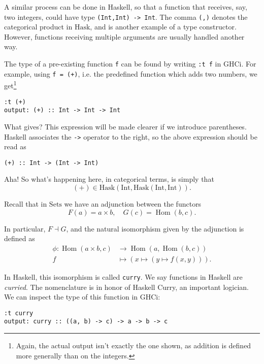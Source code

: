 \documentclass[11pt]{article}
\theoremstyle{nonumberplain}
\newcommand{\Hask}{\mathrm{Hask}}
\newcommand{\type}[1]{\mathrm{#1}}
\newcommand{\cat}[1]{\mathrm{#1}}
\DeclareMathOperator{\Hom}{Hom}
\newcommand*\lsin{\lstinline}
\begin{document}
A similar process can be done in Haskell, so that a function that receives, say, two integers, could have type \lsin|(Int,Int) -> Int|. The comma \lsin|(,)| denotes the categorical product in $\Hask$, and is another example of a type constructor. However, functions receiving multiple arguments are usually handled another way.

The type of a pre-existing function \lsin|f| can be found by writing \lsin|:t f| in GHCi. For example, using \lsin|f = (+)|, i.e. the predefined function which adds two numbers, we get\footnote{Again, the actual output isn't exactly the one shown, as addition is defined more generally than on the integers.}
\begin{lstlisting}
:t (+)
output: (+) :: Int -> Int -> Int
\end{lstlisting}

What gives? This expression will be made clearer if we introduce parentheses. Haskell associates the \lsin|->| operator to the right, so the above expression should be read as
\begin{lstlisting}
(+) :: Int -> (Int -> Int)
\end{lstlisting}

Aha! So what's happening here, in categorical terms, is simply that
\begin{equation}
(+) \in \Hask(\type{Int}, \Hask(\type{Int}, \type{Int})).
\end{equation}

Recall that in $\cat{Sets}$ we have an adjunction between the functors
\begin{equation}
F(a) = a \times b, \quad G(c) = \Hom(b,c).
\end{equation}

In particular, $F \dashv G$, and the natural isomorphism given by the adjunction is defined as
\begin{equation}
\begin{aligned}
\phi \colon \Hom(a \times b, c) &\to \Hom(a, \Hom(b,c))\\
f &\mapsto (x \mapsto (y \mapsto f(x,y))).
\end{aligned}
\end{equation}

In Haskell, this isomorphism is called \lsin|curry|. We say functions in Haskell are \emph{curried}. The nomenclature is in honor of Haskell Curry, an important logician. We can inspect the type of this function in GHCi:
\begin{lstlisting}
:t curry
output: curry :: ((a, b) -> c) -> a -> b -> c
\end{lstlisting}
\end{document}
